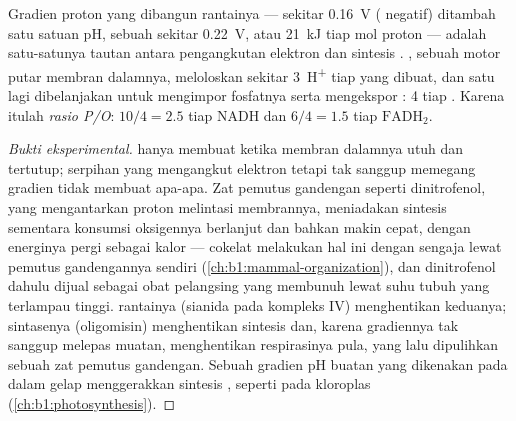 \begin{theorem}\label{thm:b1:respiration-fermentation:chemiosmosis}
Gradien proton yang dibangun rantainya --- sekitar \qty{0.16}{V}
 ( negatif) ditambah satu satuan pH, sebuah
\emph{} sekitar \qty{0.22}{V}, atau \qty{21}{kJ} tiap
mol proton --- adalah satu-satunya tautan antara pengangkutan elektron
dan sintesis . , sebuah motor putar membran dalamnya,
meloloskan sekitar \qty{3}{H^+} tiap  yang dibuat, dan satu lagi
dibelanjakan untuk mengimpor fosfatnya serta mengekspor : 4 tiap
. Karena itulah \emph{rasio P/O}: $10/4 = 2.5$ 
tiap NADH dan $6/4 = 1.5$ tiap $\mathrm{FADH_2}$.
\end{theorem}
\begin{proof}[Bukti eksperimental]
 hanya membuat  ketika membran dalamnya utuh dan
tertutup; serpihan yang mengangkut elektron tetapi tak sanggup memegang
gradien tidak membuat apa-apa. Zat pemutus gandengan seperti
dinitrofenol, yang mengantarkan proton melintasi membrannya,
meniadakan sintesis  sementara konsumsi oksigennya berlanjut dan
bahkan makin cepat, dengan energinya pergi sebagai kalor --- 
cokelat melakukan hal ini dengan sengaja lewat  pemutus
gandengannya sendiri (\cref{ch:b1:mammal-organization}), dan
dinitrofenol dahulu dijual sebagai obat pelangsing yang membunuh lewat
suhu tubuh yang terlampau tinggi.  rantainya (sianida pada
kompleks IV) menghentikan keduanya;  sintasenya (oligomisin)
menghentikan sintesis  dan, karena gradiennya tak sanggup melepas
muatan, menghentikan respirasinya pula, yang lalu dipulihkan sebuah zat
pemutus gandengan. Sebuah gradien pH buatan yang dikenakan pada
 dalam gelap menggerakkan sintesis , seperti pada
kloroplas (\cref{ch:b1:photosynthesis}).
\end{proof}

